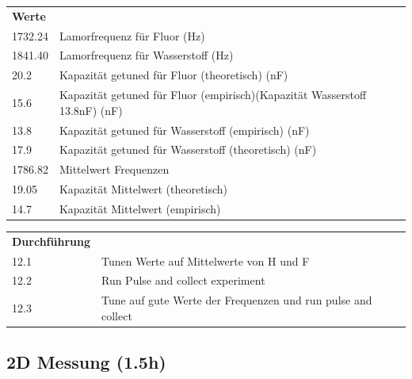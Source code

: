 \begin{tabular}{ll}

    {\bf Werte} &            \\
    
       1732.24 & Lamorfrequenz für Fluor (Hz) \\
    
       1841.40 & Lamorfrequenz für Wasserstoff (Hz) \\
    
          20.2 & Kapazität getuned für Fluor (theoretisch) (nF) \\
    
          15.6 & Kapazität getuned für Fluor (empirisch)(Kapazität Wasserstoff 13.8nF) (nF) \\
    
          13.8 & Kapazität getuned für Wasserstoff (empirisch) (nF) \\
    
          17.9 & Kapazität getuned für Wasserstoff (theoretisch) (nF) \\
    
       1786.82 & Mittelwert Frequenzen \\
    
         19.05 & Kapazität Mittelwert (theoretisch) \\
    
          14.7 & Kapazität Mittelwert (empirisch) \\
    
    \end{tabular}  


    \vspace{1cm}




\begin{tabular}{ll}

    \textbf{Durchführung} & \\

    12.1 & Tunen Werte auf Mittelwerte von H und F \\

    12.2 & Run Pulse and collect experiment \\

    12.3 & Tune auf gute Werte der Frequenzen und run pulse and collect\\

\end{tabular}  

\subsection{2D Messung (1.5h)}


